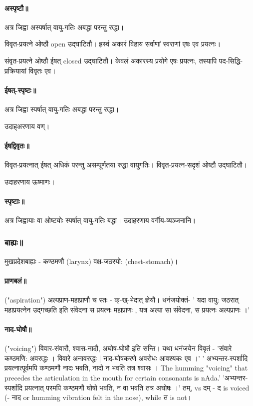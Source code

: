\documentclass[oneside, article]{memoir}
\begin{document}
\paragraph{अस्पृष्टौ॥}
अत्र जिह्वा अस्पर्षात् वायु-गतिः अबद्धा परन्तु रुद्धा।

विवृत-प्रयत्ने ओष्ठौ open उद्घाटितौ। ह्रस्वं अकारं विहाय सर्वाणां स्वराणां एषः एव प्रयत्नः।

संवृत-प्रयत्ने ओष्ठौ ईषत् closed उद्घाटितौ। केवलं अकारस्य प्रयोगे एषः प्रयत्नः, तस्यापि पद-सिद्धि-प्रक्रियायां विवृतः एव।

\paragraph{ईषत्-स्पृष्टः॥}
अत्र जिह्वा स्पर्षात् वायु-गतिः अबद्धा परन्तु रुद्धा।

उदाह्अरणाय वण्।

\paragraph{ ईषद्विवृतः॥}
विवृत-प्रयत्नात् ईषत् अधिकं परन्तु असम्पूर्णतया रुद्धा वायुगतिः। विवृत-प्रयत्न-सदृशं ओष्टौ उद्घाटितौ।

उदाहरणाय ऊष्माणः।

\paragraph{स्पृष्टाः॥}
अत्र जिह्वायाः वा‌ ओष्टयोः स्पर्षात् वायु-गतिः बद्धा। उदाहरणाय वर्गीय-व्यञ्जनानि।

\subsubsection{बाह्यः॥}
मुखप्रदेशबाह्यः -  कण्ठमणौ (larynx) वक्ष-जठरयो: (chest-stomach)।

\paragraph{प्राणबलं॥}
("aspiration") अल्पप्राण-महाप्राणौ च स्तः - क्-ख्-भेदात् ज्ञेयौ। धनंजयोक्तं- ' यदा वायु: जठरात् महाप्रयत्नेन उद्गच्छति इति संवेदना स प्रयत्नः महाप्राणः , यत्र अल्पा सा संवेदना, स प्रयत्नः अल्पप्राणः ।'

\paragraph{नाद-घोषौ॥}
("voicing") विवार-संवारौ, श्वास-नादौ, अघोष-घोषौ इति सन्ति। यथा धनंजयेन विवृतं - 'संवारे कण्ठमणि: अवरुद्धः । विवारे अनावरुद्धः | नाद-घोषकरणे अवरोधः आवश्यकः एव ।' ' अभ्यन्तर-स्पर्शादि प्रयत्नात्पूर्वमपि कण्ठमणौ नादः भवति, नादो न भवति तत्र श्वासः । The humming "voicing" that precedes the articulation in the mouth for certain consonants is nAda.' 'अभ्यन्तर-स्पर्शादि प्रयत्नात् परमपि कण्ठमणौ घोषो भवति, न वा भवति तत्र अघोषः ।' तम्, vs दम् - द is voiced (- नाद or humming vibration felt in the nose), while त is not।
\end{document}
